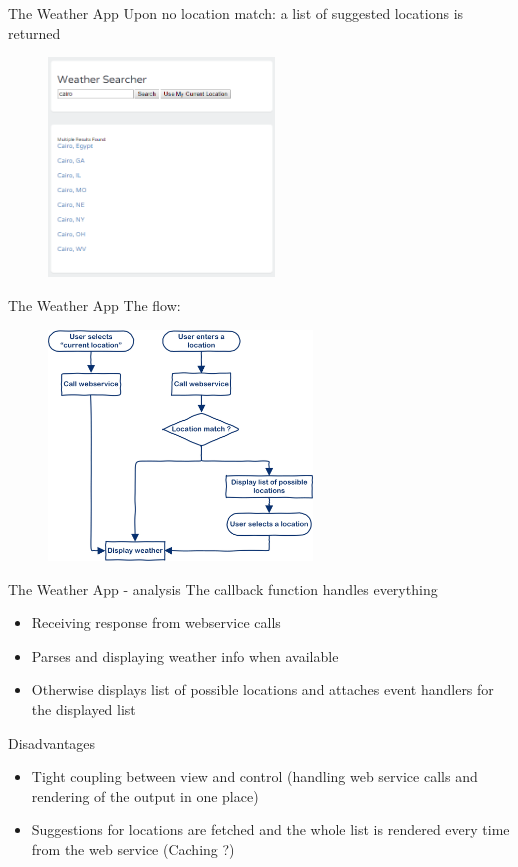 \documentclass{beamer}
\begin{document}
 \begin{frame}{The Weather App}
Upon no location match: a list of suggested locations is returned
    \begin{figure}[htp]
    \centering
    \includegraphics[width=6cm]{pics/weathersearcher}
    \label{fig:weather2}
    \end{figure}
\end{frame}

 \begin{frame}{The Weather App}
The flow:
    \begin{figure}[htp]
    \centering
    \includegraphics[width=7cm]{pics/weatherapp}
    \label{fig:weather}
    \end{figure}
\end{frame}

\begin{frame}{The Weather App - analysis}
The callback function handles everything
    \begin{itemize}
      \item Receiving response from webservice calls
      \item Parses and displaying weather info when available
      \item Otherwise displays list of possible locations and attaches event handlers for the displayed list
    \end{itemize}
    \begin{block}{Disadvantages}
      \begin{itemize}
    \item Tight coupling between view and control (handling web service calls and rendering of the output in one place)
    \item Suggestions for locations are fetched and the whole list is rendered every time from the web service (Caching ?)
    \end{itemize}
    \end{block}
\end{frame}
\end{document}
